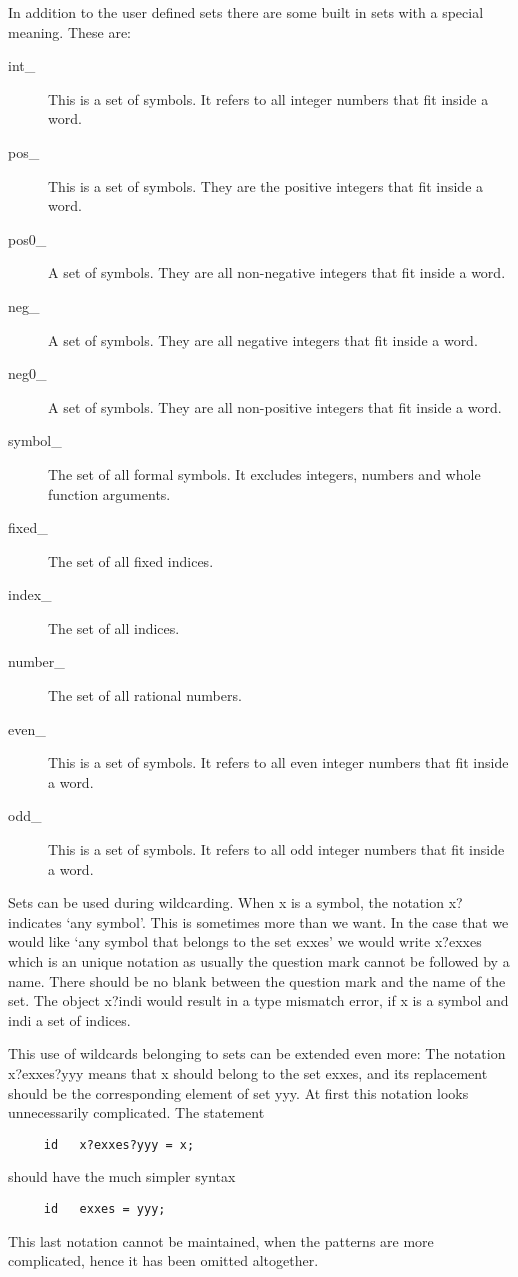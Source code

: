 In addition to the user defined sets there are some built in sets with a 
special meaning. These are:
\begin{description}
\item[int\_] This is a set of symbols. It refers to all integer numbers 
	that fit inside a {\FORM} word.
\item[pos\_] This is a set of symbols. They are the positive integers that 
    fit inside a {\FORM} word.
\item[pos0\_] A set of symbols. They are all non-negative integers that 
fit inside a {\FORM} word.
\item[neg\_]  A set of symbols. They are all negative integers that 
fit inside a {\FORM} word.
\item[neg0\_]  A set of symbols. They are all non-positive integers that 
fit inside a {\FORM} word.
\item[symbol\_] The set of all formal symbols. It excludes integers, 
    numbers and whole function arguments.
\item[fixed\_] The set of all fixed indices.
\item[index\_] The set of all indices.
\item[number\_] The set of all rational numbers.
\item[even\_] This is a set of symbols. It refers to all even integer numbers 
	that fit inside a {\FORM} word.
\item[odd\_] This is a set of symbols. It refers to all odd integer numbers 
	that fit inside a {\FORM} word.
\end{description}

Sets can be used during wildcarding. When x is a symbol, 
the notation x? indicates `any symbol'. This is sometimes more than we 
want. In the case that we would like `any symbol that belongs to the set 
exxes' we would write x?exxes which is an unique notation as usually 
the question mark cannot be followed by a name. There should be no blank 
between the question mark and the name of the set. The object x?indi 
would result in a type mismatch error, if x is a symbol and indi a set of 
indices. 

This use of wildcards belonging to sets can be extended even more: 
The notation x?exxes?yyy means that x should belong to the set exxes, and
its replacement should be the corresponding element of set yyy. At first 
this notation looks unnecessarily complicated. The statement 
\begin{verbatim}
     id   x?exxes?yyy = x;
\end{verbatim}
should have the much simpler syntax
\begin{verbatim}
     id   exxes = yyy;
\end{verbatim}
This last notation cannot be maintained, when the patterns are more 
complicated, hence it has been omitted altogether.

